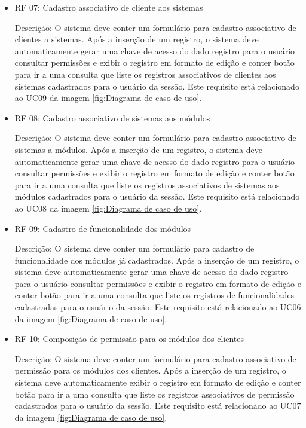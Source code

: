 \begin{itemize}
\item RF 07: Cadastro associativo de cliente aos sistemas


Descrição: O sistema deve conter um formulário para cadastro associativo de clientes a sistemas. Após a inserção de um registro, o sistema deve automaticamente gerar uma chave de acesso do dado registro para o usuário consultar permissões e exibir o registro em formato de edição e conter botão para ir a uma consulta que liste os registros associativos de clientes aos sistemas cadastrados para o usuário da sessão. Este requisito está relacionado ao UC09 da imagem \ref{fig:Diagrama de caso de uso}.


\item RF 08: Cadastro associativo de  sistemas aos módulos


Descrição: O sistema deve conter um formulário para cadastro associativo de sistemas a módulos. Após a inserção de um registro, o sistema deve automaticamente gerar uma chave de acesso do dado registro para o usuário consultar permissões e exibir o registro em formato de edição e conter botão para ir a uma consulta que liste os registros associativos de  sistemas aos módulos cadastrados para o usuário da sessão. Este requisito está relacionado ao UC08 da imagem \ref{fig:Diagrama de caso de uso}.


\item RF 09: Cadastro de funcionalidade dos módulos


Descrição: O sistema deve conter um formulário para cadastro de funcionalidade dos módulos já cadastrados. Após a inserção de um registro, o sistema deve automaticamente gerar uma chave de acesso do dado registro para o usuário consultar permissões e exibir o registro em formato de edição e conter botão para ir a uma consulta que liste os registros de funcionalidades cadastradas para o usuário da sessão. Este requisito está relacionado ao UC06 da imagem \ref{fig:Diagrama de caso de uso}.


\item RF 10: Composição de permissão para os módulos dos clientes


Descrição: O sistema deve conter um formulário para cadastro associativo de permissão para os módulos dos clientes. Após a inserção de um registro, o sistema deve automaticamente exibir o registro em formato de edição e conter botão para ir a uma consulta que liste os registros associativos de permissão cadastrados para o usuário da sessão. Este requisito está relacionado ao UC07 da imagem \ref{fig:Diagrama de caso de uso}.



\end{itemize}
